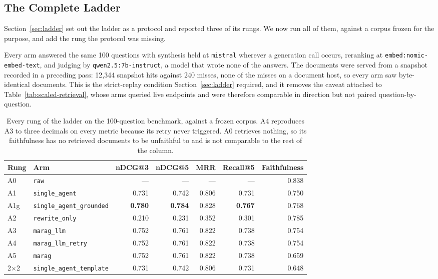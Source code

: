 \documentclass[acmsmall,review,anonymous,screen]{acmart}
\begin{document}
\subsection{The Complete Ladder}\label{sec:ladder-results}

Section~\ref{sec:ladder} set out the ladder as a protocol and reported three of
its rungs. We now run all of them, against a corpus frozen for the purpose, and
add the rung the protocol was missing.

Every arm answered the same 100 questions with synthesis held at
\texttt{mistral} wherever a generation call occurs, reranking at
\texttt{embed:nomic-embed-text}, and judging by
\texttt{qwen2.5:7b-instruct}, a model that wrote none of the answers. The
documents were served from a snapshot recorded in a preceding pass: 12,344
snapshot hits against 240 misses, none of the misses on a document host, so
every arm saw byte-identical documents. This is the strict-replay condition
Section~\ref{sec:ladder} required, and it removes the caveat attached to
Table~\ref{tab:scaled-retrieval}, whose arms queried live endpoints and were
therefore comparable in direction but not paired question-by-question.

\begin{table}[t]
\caption{Every rung of the ladder on the 100-question benchmark, against a
frozen corpus. A4 reproduces A3 to three decimals on every metric because its
retry never triggered. A0 retrieves nothing, so its faithfulness has no
retrieved documents to be unfaithful to and is not comparable to the rest of
the column.}
\label{tab:ladder-results}
\begin{tabular}{llrrrrr}
\toprule
Rung & Arm & nDCG@3 & nDCG@5 & MRR & Recall@5 & Faithfulness \\
\midrule
A0  & \texttt{raw}                   & ---   & ---   & ---   & ---   & 0.838 \\
A1  & \texttt{single\_agent}         & 0.731 & 0.742 & 0.806 & 0.731 & 0.750 \\
A1g & \texttt{single\_agent\_grounded} & \textbf{0.780} & \textbf{0.784} & 0.828 & \textbf{0.767} & 0.768 \\
A2  & \texttt{rewrite\_only}         & 0.210 & 0.231 & 0.352 & 0.301 & 0.785 \\
A3  & \texttt{marag\_llm}            & 0.752 & 0.761 & 0.822 & 0.738 & 0.754 \\
A4  & \texttt{marag\_llm\_retry}     & 0.752 & 0.761 & 0.822 & 0.738 & 0.754 \\
A5  & \texttt{marag}                 & 0.752 & 0.761 & 0.822 & 0.738 & 0.659 \\
2$\times$2 & \texttt{single\_agent\_template} & 0.731 & 0.742 & 0.806 & 0.731 & 0.648 \\
\bottomrule
\end{tabular}
\end{table}
\end{document}

